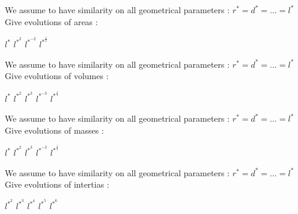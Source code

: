 \documentclass{webquiz}
\begin{document}
  
   \begin{question} 
    We assume to have similarity on all geometrical parameters :  $r^* = d^* = …=  l^*$ \\
    \newline
	Give evolutions of areas : 
     \begin{choice}
      \incorrect  $ l^*$
      \incorrect  $ l^{*^2}$ 
      \incorrect $ l^{*^{-2}}$ 
      \correct  $ l^{*^{\frac{1}{2}}}$ 
     \end{choice} 
   \end{question}
     
   \begin{question} 
    We assume to have similarity on all geometrical parameters :  $r^* = d^* = …=  l^*$ \\
    \newline
	Give evolutions of volumes : 
     \begin{choice}
      \incorrect  $ l^*$
      \incorrect  $ l^{*^2}$ 
      \incorrect  $ l^{*^3}$ 
      \incorrect $ l^{*^{-3}}$ 
      \correct  $ l^{*^{\frac{1}{3}}}$ 
     \end{choice} 
   \end{question}
   
   \begin{question} 
     We assume to have similarity on all geometrical parameters :  $r^* = d^* = …=  l^*$ \\
    \newline
	Give evolutions of masses : 
     \begin{choice}
      \incorrect  $ l^*$
      \incorrect  $ l^{*^2}$ 
      \incorrect  $ l^{*^3}$ 
      \incorrect $ l^{*^{-3}}$ 
      \correct  $ l^{*^{\frac{1}{3}}}$ 
     \end{choice} 
   \end{question}
     \begin{question} 
   We assume to have similarity on all geometrical parameters :  $r^* = d^* = …=  l^*$ \\
    \newline
	Give evolutions of intertias : 
     \begin{choice}
      \incorrect  $ l^{*^2}$ 
      \incorrect  $ l^{*^3}$ 
         \incorrect  $ l^{*^4}$
      \incorrect $ l^{*^{5}}$ 
      \correct  $ l^{*^6}$ 
     \end{choice} 
   \end{question}
     
\end{document}
